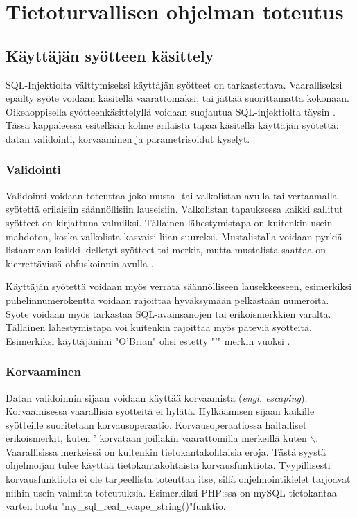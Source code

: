 \documentclass[finnish]{tktltiki2}
\theoremstyle{definition}
\theoremstyle{remark}
\begin{document}
	\section {Tietoturvallisen ohjelman toteutus}
	\subsection{Käyttäjän syötteen käsittely}
		SQL-Injektiolta välttymiseksi käyttäjän syötteet on tarkastettava. Vaaralliseksi epäilty syöte voidaan käsitellä vaarattomaksi, tai jättää suorittamatta kokonaan. Oikeaoppisella syötteenkäsittelyllä voidaan suojautua SQL-injektiolta täysin \cite{prepared}. Tässä kappaleessa esitellään kolme erilaista tapaa käsitellä käyttäjän syötettä: datan validointi, korvaaminen ja parametrisoidut kyselyt.
		
		 \subsubsection{Validointi}
		 Validointi voidaan toteuttaa joko musta- tai valkolistan avulla tai vertaamalla syötettä erilaisiin säännöllisiin lauseisiin. Valkolistan tapauksessa kaikki sallitut syötteet on kirjattuna valmiiksi. Tällainen lähestymistapa on kuitenkin usein mahdoton, koska valkolista kasvaisi liian suureksi. Mustalistalla voidaan pyrkiä listaamaan kaikki kielletyt syötteet tai merkit, mutta mustalista saattaa on kierrettävissä obfuskoinnin avulla \cite{encoding}. 
		
		Käyttäjän syötettä voidaan myös verrata säännölliseen lausekkeeseen, esimerkiksi puhelinnumerokenttä voidaan rajoittaa hyväksymään pelkästään numeroita. Syöte voidaan myös tarkastaa SQL-avainsanojen tai erikoismerkkien varalta. Tällainen lähestymistapa voi kuitenkin rajoittaa myös päteviä syötteitä. Esimerkiksi käyttäjänimi "O'Brian" olisi estetty "'" merkin vuoksi \cite{generation}.
		
		
		\subsubsection{Korvaaminen}
		Datan validoinnin sijaan voidaan käyttää korvaamista (\textit{engl. escaping}). Korvaamisessa vaarallisia syötteitä ei hylätä. Hylkäämisen sijaan kaikille syötteille suoritetaan korvausoperaatio. Korvausoperaatiossa haitalliset erikoismerkit, kuten ' korvataan joillakin vaarattomilla merkeillä kuten $\backslash$. Vaarallisissa merkeissä on kuitenkin tietokantakohtaisia eroja. Tästä syystä ohjelmoijan tulee käyttää tietokantakohtaista korvausfunktiota. Tyypillisesti korvausfunktiota ei ole tarpeellista toteuttaa itse, sillä ohjelmointikielet tarjoavat niihin usein valmiita toteutuksia. Esimerkiksi PHP:ssa on mySQL tietokantaa varten luotu "my{\_}sql{\_}real{\_}ecape\_string()"\space funktio. 
		
\end{document}
